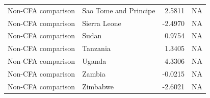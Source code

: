 \begin{table}
\begin{tabular}[t]{llrr}
Non-CFA comparison & Sao Tome and Principe & 2.5811 & NA\\
Non-CFA comparison & Sierra Leone & -2.4970 & NA\\
\addlinespace
Non-CFA comparison & Sudan & 0.9754 & NA\\
Non-CFA comparison & Tanzania & 1.3405 & NA\\
Non-CFA comparison & Uganda & 4.3306 & NA\\
Non-CFA comparison & Zambia & -0.0215 & NA\\
Non-CFA comparison & Zimbabwe & -2.6021 & NA\\
\bottomrule
\end{tabular}
\end{table}